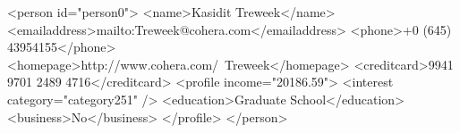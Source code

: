 \begin{fakeXML}[label=xml,caption=XMARK data with of \textit{person0}]
	
	<person id="person0">
	<name>Kasidit Treweek</name>
	<emailaddress>mailto:Treweek@cohera.com</emailaddress>
	<phone>+0 (645) 43954155</phone>
	<homepage>http://www.cohera.com/~Treweek</homepage>
	<creditcard>9941 9701 2489 4716</creditcard>
	<profile income="20186.59">
	<interest category="category251" />
	<education>Graduate School</education>
	<business>No</business>
	</profile>
	</person>
\end{fakeXML} 

\iffalse
\begin{minipage}{.5\textwidth}
	\begin{tikzpicture}[%
	grow via three points={one child at (0.5,-0.7) and
		two children at (0.5,-0.7) and (0.5,-1.4)},
	edge from parent path={(\tikzparentnode.south) |- (\tikzchildnode.west)}]
	\node {\{asfdasfd\}}
	child { node [defi] {\textit{Schema\_ID}}}
	child { node [json] {xs:attribute}
		child { node [defi] {\textit{Attribute\_ID}}}
		child { node [attribute] {@name}}
		child { node [attribute] {@type}}
		child { node [attribute] {@fixed}}
		child { node [attribute] {@default}}
	};
	\end{tikzpicture}
\end{minipage}

\fi